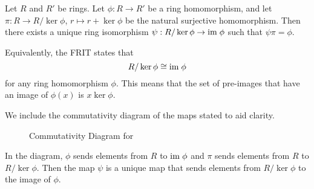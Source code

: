 \begin{theorem}\label{thrm-ring-isomorphism-1}
    Let $R$ and $R'$ be rings. Let $\phi: R \to R'$ be a ring homomorphism, and let $\pi: R \to R/\ker\phi$, $r\mapsto r + \ker\phi$ be the natural surjective homomorphism. Then there exists a unique ring isomorphism $\psi: R / \ker\phi \to \mathrm{im}\;\phi$ such that $\psi\pi = \phi$.
\end{theorem}
\begin{remark}
    Equivalently, the FRIT states that
    \[
        R / \ker\phi \cong \mathrm{im}\;\phi
    \]
    for any ring homomorphism $\phi$. This means that the set of pre-images that have an image of $\phi(x)$ is $x\ker\phi$.
\end{remark}

We include the commutativity diagram of the maps stated to aid clarity.
\begin{figure}[h]
    \centering
    \caption{Commutativity Diagram for }
\end{figure}

In the diagram, $\phi$ sends elements from $R$ to $\mathrm{im}\;\phi$ and $\pi$ sends elements from $R$ to $R/\ker\phi$. Then the map $\psi$ is a unique map that sends elements from $R/\ker\phi$ to the image of $\phi$.

